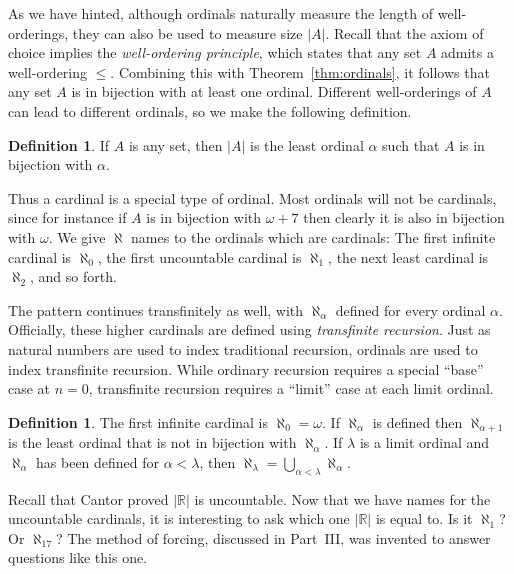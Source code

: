 \documentclass[11pt,oneside]{amsbook}
\newcommand{\R}{\mathbb R}
\theoremstyle{definition}
\theoremstyle{plain}
\theoremstyle{definition}
\newtheorem{definition}[theorem]{Definition}
\theoremstyle{remark}
\numberwithin{equation}{section}
\numberwithin{figure}{section}
\begin{document}
As we have hinted, although ordinals naturally measure the length of well-orderings, they can also be used to measure size $|A|$. Recall that the axiom of choice implies the \emph{well-ordering principle}, which states that any set $A$ admits a well-ordering $\leq$. Combining this with Theorem~\ref{thm:ordinals}, it follows that any set $A$ is in bijection with at least one ordinal. Different well-orderings of $A$ can lead to different ordinals, so we make the following definition.

\begin{definition}
  If $A$ is any set, then $|A|$ is the least ordinal $\alpha$ such that $A$ is in bijection with $\alpha$.
\end{definition}

Thus a cardinal is a special type of ordinal. Most ordinals will not be cardinals, since for instance if $A$ is in bijection with $\omega+7$ then clearly it is also in bijection with $\omega$. We give $\aleph$ names to the ordinals which are cardinals: The first infinite cardinal is $\aleph_0$, the first uncountable cardinal is $\aleph_1$, the next least cardinal is $\aleph_2$, and so forth.

The pattern continues transfinitely as well, with $\aleph_\alpha$ defined for every ordinal $\alpha$. Officially, these higher cardinals are defined using \emph{transfinite recursion}. Just as natural numbers are used to index traditional recursion, ordinals are used to index transfinite recursion. While ordinary recursion requires a special ``base'' case at $n=0$, transfinite recursion requires a ``limit'' case at each limit ordinal.

\begin{definition}
  The first infinite cardinal is $\aleph_0=\omega$. If $\aleph_\alpha$ is defined then $\aleph_{\alpha+1}$ is the least ordinal that is not in bijection with $\aleph_\alpha$. If $\lambda$ is a limit ordinal and $\aleph_\alpha$ has been defined for $\alpha<\lambda$, then $\aleph_\lambda=\bigcup_{\alpha<\lambda}\aleph_\alpha$.
\end{definition}


Recall that Cantor proved $|\R|$ is uncountable. Now that we have names for the uncountable cardinals, it is interesting to ask which one $|\R|$ is equal to. Is it $\aleph_1$? Or $\aleph_{17}$? The method of forcing, discussed in Part~III, was invented to answer questions like this one.
\end{document}
